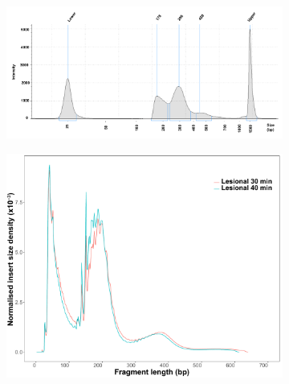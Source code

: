 \begin{figure}[htbp]
\centering
\begin{subfigure}{0.45\textwidth}
\centering
\includegraphics[width=\textwidth]{./Results1/pdfs/ATAC_PS02_tapestation_30min}
\caption{\textbf{}}
\end{subfigure}
\begin{subfigure}{0.45\textwidth}
\centering
\includegraphics[width=\textwidth]{./Results1/pdfs/ATAC_PS-2_30_40_min_fragment_size_distribution}
\caption{\textbf{}}
\end{subfigure}
\begin{subfigure}{0.5\textwidth}
\centering

\end{subfigure}
\end{figure}
